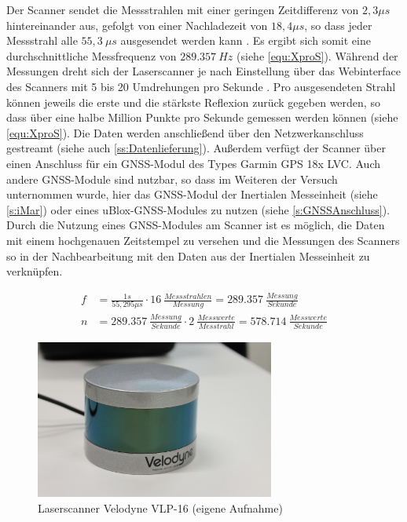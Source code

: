 \documentclass[a4paper,12pt,bibliography=totoc, listof=totoc,titlepage,pointlessnumbers]{scrreprt}
\begin{document}
Der Scanner sendet die Messstrahlen mit einer geringen Zeitdifferenz von \(2,3\mu s\) hintereinander aus, gefolgt von einer Nachladezeit von \(18,4\mu s\), so dass jeder Messstrahl alle \(55,3~\mu s\) ausgesendet werden kann \citep[S. 16]{vlpManual}. Es ergibt sich somit eine durchschnittliche Messfrequenz von \(289.357~Hz\) (siehe \autoref{equ:XproS}). Während der Messungen dreht sich der Laserscanner je nach Einstellung über das Webinterface des Scanners mit 5 bis 20 Umdrehungen pro Sekunde \citep{vlpSheet}. Pro ausgesendeten Strahl können jeweils die erste und die stärkste Reflexion zurück gegeben werden, so dass über eine halbe Million Punkte pro Sekunde gemessen werden können (siehe \autoref{equ:XproS}). Die Daten werden anschließend über den Netzwerkanschluss gestreamt (siehe auch \autoref{ss:Datenlieferung}). Außerdem verfügt der Scanner über einen Anschluss für ein GNSS-Modul des Types Garmin GPS 18x LVC. Auch andere GNSS-Module sind nutzbar, so dass im Weiteren der Versuch unternommen wurde, hier das GNSS-Modul der Inertialen Messeinheit (siehe \autoref{s:iMar}) oder eines uBlox-GNSS-Modules zu nutzen (siehe \autoref{s:GNSSAnschluss}). Durch die Nutzung eines GNSS-Modules am Scanner ist es möglich, die Daten mit einem hochgenauen Zeitstempel zu versehen und die Messungen des Scanners so in der Nachbearbeitung mit den Daten aus der Inertialen Messeinheit zu verknüpfen.

\begin{equation}
 \label{equ:XproS}
 \begin{aligned}
  f &= \frac{1s}{55,295\mu s} \cdot 16~\frac{Messstrahlen}{Messung} = 289.357~\frac{Messung}{Sekunde} \\
  n &= 289.357~\frac{Messung}{Sekunde} \cdot 2~\frac{Messwerte}{Messtrahl} = 578.714~\frac{Messwerte}{Sekunde}
 \end{aligned}
\end{equation}

\begin{figure}[ht!]
 \centering
 \includegraphics[width=0.7\textwidth]{./img/vlp16.jpg}
 \caption{Laserscanner Velodyne VLP-16 (eigene Aufnahme)}
 \label{img:vlp16}
\end{figure}
\end{document}
